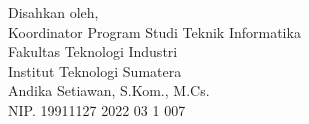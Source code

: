 \begin{center}
	\begin{center}
		\fontsize{10pt}{10pt}
        \vspace{0.45cm}
		Disahkan oleh,\\
		Koordinator Program Studi Teknik Informatika\\
		Fakultas Teknologi Industri\\
		Institut Teknologi Sumatera
		\vspace{1.8cm}\\
		Andika Setiawan, S.Kom., M.Cs. \\
		NIP. 19911127 2022 03 1 007 \\
	\end{center}
	\vfill

\end{center}
\clearpage
